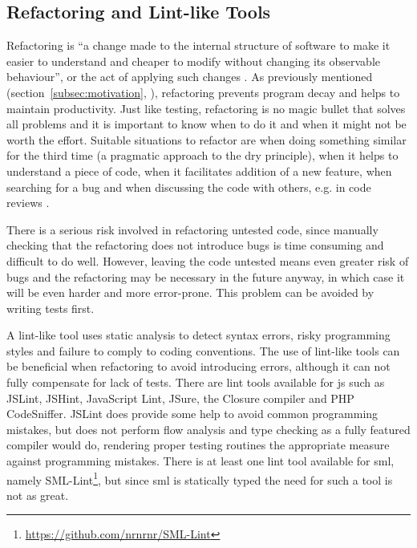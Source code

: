 \documentclass[11pt]{article}
\begin{document}
\subsection{Refactoring and Lint-like Tools}
\label{subsec:refactor}

Refactoring is ``a change made to the internal structure of software to make it easier to understand and cheaper to modify without changing its observable behaviour'', or the act of applying such changes \cite[p.~46]{Refactoring}. As previously mentioned (section~\ref{subsec:motivation}, ), refactoring prevents program decay and helps to maintain productivity. Just like testing, refactoring is no magic bullet that solves all problems and it is important to know when to do it and when it might not be worth the effort. Suitable situations to refactor are when doing something similar for the third time (a pragmatic approach to the \gls{dry} principle), when it helps to understand a piece of code, when it facilitates addition of a new feature, when searching for a bug and when discussing the code with others, e.g. in code reviews \cite[p.~49-51]{Refactoring}.

There is a serious risk involved in refactoring untested code\cite[p.~17]{Refactoring}, since manually checking that the refactoring does not introduce bugs is time consuming and difficult to do well. However, leaving the code untested means even greater risk of bugs and the refactoring may be necessary in the future anyway, in which case it will be even harder and more error-prone. This problem can be avoided by writing tests first.

A lint-like tool uses static analysis to detect syntax errors, risky programming styles and failure to comply to coding conventions. The use of lint-like tools can be beneficial when refactoring to avoid introducing errors, although it can not fully compensate for lack of tests. There are lint tools available for \gls{js} such as JSLint, JSHint, JavaScript Lint, JSure, the Closure compiler and PHP CodeSniffer. JSLint does provide some help to avoid common programming mistakes, but does not perform flow analysis \cite{JSLint} and type checking as a fully featured compiler would do, rendering proper testing routines the appropriate measure against programming mistakes. There is at least one lint tool available for \gls{sml}, namely SML-Lint\footnote{\url{https://github.com/nrnrnr/SML-Lint}}, but since \gls{sml} is statically typed the need for such a tool is not as great.
\end{document}
